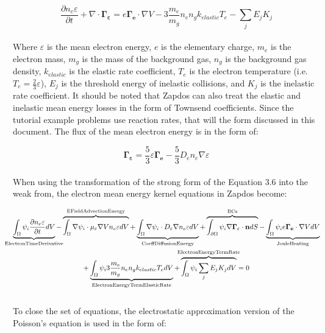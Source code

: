 \documentclass[final]{report}
\begin{document}
  \begin{equation}
      \frac{\partial n_{e}\varepsilon}{\partial t}+\nabla\cdot\mathbf{\Gamma_{\varepsilon}}=e\mathbf{\Gamma_{e}}\cdot\nabla V-3\frac{m_{e}}{m_{g}}n_{e}n_{g}k_{elastic}T_{e}-\sum_{j}{E_jK_j}
  \end{equation}
  \\
  Where $\varepsilon$ is the mean electron energy, $e$ is the elementary charge, $m_{e}$ is the electron mass, $m_{g}$ is the mass of the background gas, $n_{g}$ is the background gas density, $k_{elastic}$ is the elastic rate coefficient, $T_{e}$ is the electron temperature (i.e. $T_{e}=\frac{2}{3}\varepsilon$), $E_{j}$ is the threshold energy of inelastic collisions, and $K_{j}$ is the inelastic rate coefficient. It should be noted that Zapdos can also treat the elastic and inelastic mean energy losses in the form of Townsend coefficients. Since the tutorial example problems use reaction rates, that will the form discussed in this document. The flux of the mean electron energy is in the form of:

  \begin{equation}
      \mathbf{\Gamma_{\varepsilon}}=\frac{5}{3}\varepsilon\mathbf{\Gamma_{e}}-\frac{5}{3}D_{e}n_{e}\nabla\varepsilon
  \end{equation}
  \\
  When using the transformation of the strong form of the Equation 3.6 into the weak from, the electron mean energy kernel equations in Zapdos become:

  \begin{equation}
  \begin{gathered}
    \underbrace{\int_{\Omega}\psi_{i}\frac{\partial n_{e}\varepsilon}{\partial t} dV}_\text{\makebox[0pt]{ElectronTimeDerivative}}- \overbrace{\int_{\Omega}\nabla\psi_{i}\cdot\mu_{\varepsilon}\nabla V n_{e}\varepsilon dV}^\text{\makebox[0pt]{EFieldAdvectionEnergy}}+\underbrace{\int_{\Omega}\nabla\psi_{i}\cdot D_{\varepsilon}\nabla n_{e}\varepsilon dV}_\text{\makebox[0pt]{CoeffDiffusionEnergy}}+\overbrace{\int_{\partial\Omega}\psi_{i}\nabla \mathbf{\Gamma_{\varepsilon}}\cdot \mathbf{n} dS}^\text{\makebox[0pt]{BCs}}-\underbrace{\int_{\Omega}\psi_{i}e\mathbf{\Gamma_{e}}\cdot\nabla V  dV}_\text{\makebox[0pt]{JouleHeating}} \\
    +\underbrace{\int_{\Omega}\psi_{i}3\frac{m_{e}}{m_{g}}n_{e}n_{g}k_{elastic}T_{e}  dV}_\text{\makebox[0pt]{ElectronEnergyTermElasticRate}}+\overbrace{\int_{\Omega}\psi_{i}\sum_{j}{E_jK_j}  dV}^\text{\makebox[0pt]{ElectronEnergyTermRate}}=0
  \end{gathered}
  \end{equation}
  \\
  To close the set of equations, the electrostatic approximation version of the Poisson's equation is used in the form of:
\end{document}
